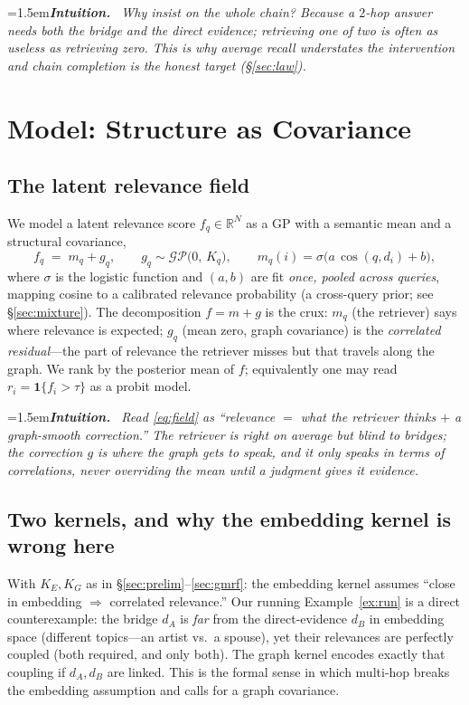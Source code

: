 \documentclass[11pt]{article}
\newenvironment{intuition}{\par\smallskip\noindent\hangindent=1.5em\textbf{\itshape Intuition.}\itshape\ \ignorespaces}{\par\smallskip}
\newcommand{\R}{\mathbb{R}}
\newcommand{\gp}{\mathcal{GP}}
\begin{document}
\begin{intuition}
Why insist on the \emph{whole} chain? Because a $2$-hop answer needs \emph{both} the bridge and the direct
evidence; retrieving one of two is often as useless as retrieving zero. This is why average recall understates
the intervention and chain completion is the honest target (\S\ref{sec:law}).
\end{intuition}

\section{Model: Structure as Covariance}\label{sec:model}
\subsection{The latent relevance field}
We model a latent relevance score $f_q\in\R^N$ as a GP with a semantic mean and a structural covariance,
\begin{equation}\label{eq:field}
  f_q \;=\; m_q + g_q, \qquad g_q \sim \gp\!\big(0,\, K_q\big), \qquad m_q(i) = \sigma\!\big(a\,\cos(q,d_i)+b\big),
\end{equation}
where $\sigma$ is the logistic function and $(a,b)$ are fit \emph{once, pooled across queries}, mapping cosine
to a calibrated relevance probability (a cross-query prior; see \S\ref{sec:mixture}). The decomposition
$f=m+g$ is the crux: $m_q$ (the retriever) says where relevance is expected; $g_q$ (mean zero, graph covariance)
is the \emph{correlated residual}---the part of relevance the retriever misses but that travels along the graph.
We rank by the posterior mean of $f$; equivalently one may read $r_i=\mathbf 1\{f_i>\tau\}$ as a probit model.

\begin{intuition}
Read \eqref{eq:field} as ``relevance $=$ what the retriever thinks $+$ a graph-smooth correction.'' The retriever
is right on average but blind to bridges; the correction $g$ is where the graph gets to speak, and it only
speaks in terms of \emph{correlations}, never overriding the mean until a judgment gives it evidence.
\end{intuition}

\subsection{Two kernels, and why the embedding kernel is wrong here}
With $K_E,K_G$ as in \S\ref{sec:prelim}--\ref{sec:gmrf}: the embedding kernel assumes ``close in embedding
$\Rightarrow$ correlated relevance.'' Our running Example~\ref{ex:run} is a direct counterexample: the bridge
$d_A$ is \emph{far} from the direct-evidence $d_B$ in embedding space (different topics---an artist vs.\ a
spouse), yet their relevances are perfectly coupled (both required, and only both). The graph kernel encodes
exactly that coupling if $d_A,d_B$ are linked. This is the formal sense in which multi-hop breaks the embedding
assumption and calls for a graph covariance.
\end{document}
